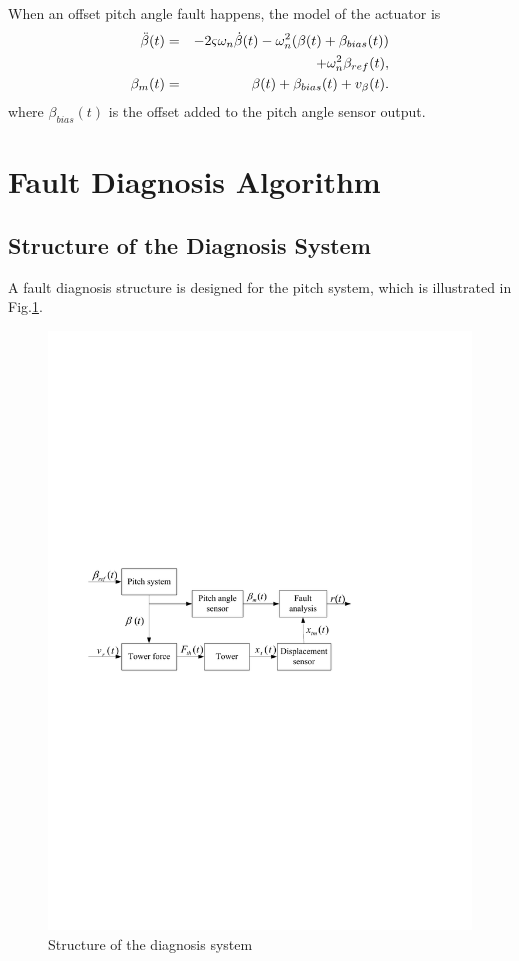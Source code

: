When an offset pitch angle fault happens, the model of the
actuator is
\begin{eqnarray}
  \ddot{\beta}(t) &=& -2\varsigma\omega_n\dot{\beta}(t) - \omega_n^2(\beta(t)+\beta_{bias}(t)) \notag\\
  &&+\omega^2_n\beta_{ref}(t), \\
  \beta_m(t) &=& \beta(t) + \beta_{bias}(t) + v_\beta(t).
\end{eqnarray}
where $\beta_{bias}(t)$ is the offset added to the pitch angle sensor output.



\section{Fault Diagnosis Algorithm }
\subsection{Structure of the Diagnosis System}

A fault diagnosis structure is designed for the pitch system,
which is illustrated in Fig.\ref{fig:faultstructure}.

\begin{figure}[!htb]
  \centering
  \includegraphics[width=\hsize]{Visio-faultstructure.pdf}
  \caption{Structure of the diagnosis system}
  \label{fig:faultstructure}
\end{figure}

